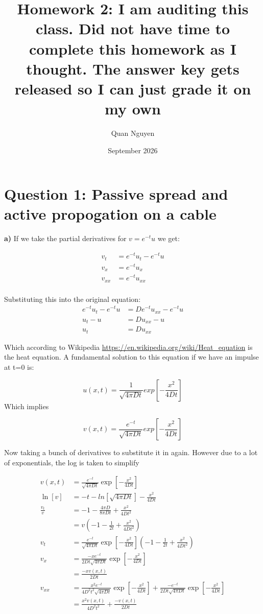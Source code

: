 \documentclass{article}
\title{Homework 2: I am auditing this class. Did not have time to complete this homework as I thought. The answer key gets released so I can just grade it on my own}
\author{Quan Nguyen}
\date{September 2026}
\begin{document}
\maketitle
\section{Question 1: Passive spread and active propogation on a cable}
\textbf{a)} If we take the partial derivatives for $v = e^{-t}u$ we get:


\begin{align}
    v_t &= e^{-t}u_t - e^{-t}u\\
    v_x &= e^{-t}u_x\\
    v_{xx} &= e^{-t}u_{xx} \\
\end{align}

Substituting this into the original equation:
\begin{align}
    e^{-t}u_t - e^{-t}u &= De^{-t}u_{xx} - e^{-t}u\\
    u_t - u &= Du_{xx} - u\\
    u_t &= Du_{xx}
\end{align}

Which according to Wikipedia \url{https://en.wikipedia.org/wiki/Heat_equation} is the heat equation. A fundamental solution to this equation if we have an impulse at t=0 is:

$$
u(x,t) = \frac{1}{\sqrt{4\pi Dt}}exp\left[ - \frac{x^2}{4Dt}\right]
$$
Which implies

$$
v(x,t) = \frac{e^{-t}}{\sqrt{4\pi Dt}}exp\left[ - \frac{x^2}{4Dt}\right]
$$

Now taking a bunch of derivatives to substitute it in again. However due to a lot of exponentials,
the log is taken to simplify

\begin{align}
    v(x,t) &= \frac{e^{-t}}{\sqrt{4\pi Dt}} \exp\left[- \frac{x^2}{4Dt}\right]\\
    \ln[v] &= -t - ln[\sqrt{4 \pi D t}] - \frac{x^2}{4Dt}\\
    \frac{v_t}{v} &= -1 - \frac{4\pi D}{8\pi D t} + \frac{x^2}{4Dt^2}\\
    &= v\left(-1 - \frac{1}{2t} + \frac{x^2}{4Dt^2}\right)\\
    v_t &= \frac{e^{-t}}{\sqrt{4\pi Dt}} \exp\left[- \frac{x^2}{4Dt}\right]\left(-1 - \frac{1}{2t} + \frac{x^2}{4Dt^2}\right)\\
    v_x &= \frac{-xe^{-t}}{2Dt\sqrt{4\pi Dt}} \exp\left[- \frac{x^2}{4Dt}\right]\\
    &= \frac{-xv(x,t)}{2Dt}\\
    v_{xx} &= \frac{x^2e^{-t}}{4D^2t^2\sqrt{4\pi Dt}} \exp\left[- \frac{x^2}{4Dt}\right]
    + \frac{-e^{-t}}{2Dt\sqrt{4\pi Dt}} \exp\left[- \frac{x^2}{4Dt}\right]\\
    &= \frac{x^2v(x,t)}{4D^2t^2} + \frac{-v(x,t)}{2Dt}\\
\end{align}
\end{document}
